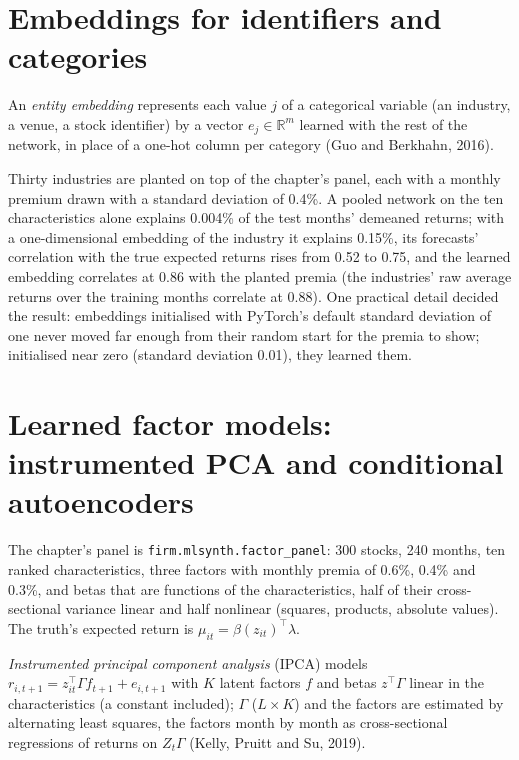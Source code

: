 \section{Embeddings for identifiers and categories}

\begin{definition}\label{def:ml:cross-sectional-deep-models:embedding}
An \emph{entity embedding} represents each value $j$ of a categorical variable (an industry, a
venue, a stock identifier) by a vector $e_j\in\mathbb R^m$ learned with the rest of the network, in place of a one-hot
column per category (Guo and Berkhahn, 2016).
\end{definition}

Thirty industries are planted on top of the chapter's panel, each with a monthly premium drawn with a standard deviation
of 0.4\%. A pooled network on the ten characteristics alone explains 0.004\% of the test months' demeaned returns; with a
one-dimensional embedding of the industry it explains 0.15\%, its forecasts'
correlation with the true expected returns rises from 0.52 to 0.75, and the learned embedding correlates at 0.86 with the
planted premia (the industries' raw average returns over the training months correlate at 0.88). One practical detail
decided the result: embeddings initialised with PyTorch's default standard deviation of one never moved far enough from
their random start for the premia to show; initialised near zero (standard deviation 0.01), they learned them.

\section{Learned factor models: instrumented PCA and conditional autoencoders}

The chapter's panel is \texttt{firm.mlsynth.factor\_panel}: 300 stocks, 240 months, ten ranked characteristics, three
factors with monthly premia of 0.6\%, 0.4\% and 0.3\%, and betas that are functions of the characteristics, half of their
cross-sectional variance linear and half nonlinear (squares, products, absolute values). The truth's expected return is
$\mu_{it} = \beta(z_{it})^\top\lambda$.

\begin{definition}\label{def:ml:cross-sectional-deep-models:ipca}
\emph{Instrumented principal component analysis} (IPCA) models
$r_{i,t+1} = z_{it}^\top\Gamma f_{t+1} + e_{i,t+1}$ with $K$ latent factors $f$ and betas $z^\top\Gamma$ linear in the
characteristics (a constant included); $\Gamma$ ($L\times K$) and the factors are estimated by alternating least squares,
the factors month by month as cross-sectional regressions of returns on $Z_t\Gamma$ (Kelly, Pruitt and Su, 2019).
\end{definition}

